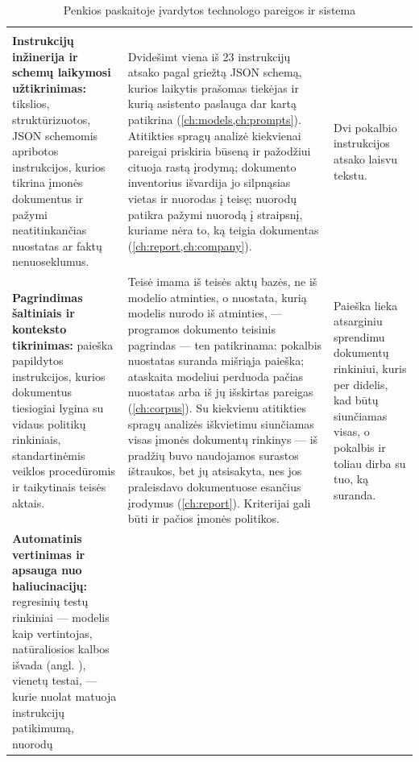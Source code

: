 \begin{xltabular}{\textwidth}{@{}L{34mm}YY@{}}
\caption{Penkios paskaitoje įvardytos technologo pareigos ir sistema}\label{tab:course:duties}\\
\toprule
{} &  &  \\
\midrule
\endfirsthead
\toprule
{} &  &  \\
\midrule
\endhead
\bottomrule
\endlastfoot
\textbf{Instrukcijų inžinerija ir schemų laikymosi užtikrinimas:} tikslios, struktūrizuotos, JSON
  schemomis apribotos instrukcijos, kurios tikrina įmonės dokumentus ir pažymi neatitinkančias
  nuostatas ar faktų nenuoseklumus. &
  Dvidešimt viena iš 23 instrukcijų atsako pagal griežtą JSON schemą, kurios laikytis prašomas
  tiekėjas ir kurią asistento paslauga dar kartą patikrina (\cref{ch:models,ch:prompts}).
  Atitikties spragų analizė kiekvienai pareigai priskiria būseną ir pažodžiui cituoja rastą
  įrodymą; dokumento inventorius išvardija jo silpnąsias vietas ir nuorodas į teisę; nuorodų
  patikra pažymi nuorodą į straipsnį, kuriame nėra to, ką teigia dokumentas
  (\cref{ch:report,ch:company}). &
  Dvi pokalbio instrukcijos atsako laisvu tekstu. \\
\textbf{Pagrindimas šaltiniais ir konteksto tikrinimas:} paieška papildytos instrukcijos,
  kurios dokumentus tiesiogiai lygina su vidaus politikų rinkiniais, standartinėmis veiklos
  procedūromis ir taikytinais teisės aktais. &
  Teisė imama iš teisės aktų bazės, ne iš modelio atminties, o nuostata, kurią modelis
  nurodo iš atminties, --- programos dokumento teisinis pagrindas --- ten patikrinama: pokalbis
  nuostatas suranda mišriąja paieška; ataskaita modeliui perduoda pačias nuostatas arba iš jų
  išskirtas pareigas (\cref{ch:corpus}). Su kiekvienu atitikties spragų analizės iškvietimu
  siunčiamas visas įmonės dokumentų rinkinys --- iš pradžių buvo naudojamos surastos ištraukos,
  bet jų atsisakyta, nes jos praleisdavo dokumentuose esančius įrodymus (\cref{ch:report}).
  Kriterijai gali būti ir pačios įmonės politikos. &
  Paieška lieka atsarginiu sprendimu dokumentų rinkiniui, kuris per didelis, kad būtų siunčiamas visas, o
  pokalbis ir toliau dirba su tuo, ką suranda. \\
\textbf{Automatinis vertinimas ir apsauga nuo haliucinacijų:} regresinių testų rinkiniai ---
  modelis kaip vertintojas, natūraliosios kalbos išvada (angl. ), vienetų testai, --- kurie nuolat matuoja instrukcijų patikimumą, nuorodų

\end{xltabular}
